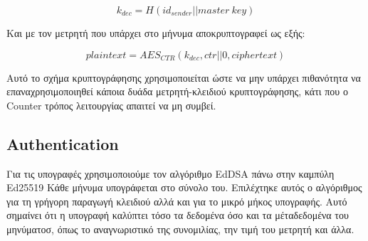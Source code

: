 \[
k_{dec} = H(id_{sender} || master\ key)
\]

Και με τον μετρητή που υπάρχει στο μήνυμα αποκρυπτογραφεί ως εξής:

\[
plaintext = AES_{CTR}(k_{dec}, ctr||0, ciphertext)
\]

Αυτό το σχήμα κρυπτογράφησης χρησιμοποιείται ώστε να μην υπάρχει πιθανότητα να επαναχρησιμοποιηθεί κάποια δυάδα μετρητή-κλειδιού κρυπτογράφησης, κάτι που ο Counter τρόπος λειτουργίας απαιτεί να μη συμβεί.

\subsection{Authentication}

Για τις υπογραφές χρησιμοποιούμε τον αλγόριθμο EdDSA πάνω στην καμπύλη Ed25519
Κάθε μήνυμα υπογράφεται στο σύνολο του.
Επιλέχτηκε αυτός ο αλγόριθμος για τη γρήγορη παραγωγή κλειδιού αλλά και για το μικρό μήκος υπογραφής.
Αυτό σημαίνει ότι η υπογραφή καλύπτει τόσο τα δεδομένα όσο και τα μέταδεδομένα του μηνύματοσ, όπως το αναγνωριστικό της συνομιλίας, την τιμή του μετρητή και άλλα.
